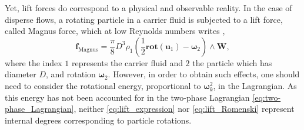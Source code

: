 \documentclass{myclass}
\newcommand{\vel}{\bm{u}}
\newcommand{\lift}{\bm{f}}
\newcommand{\pth}[1]  {\left( #1 \right)}
\newcommand{\rot}{\mathbf{rot}}
\begin{document}
Yet, lift forces do correspond to a physical and observable reality. In the case of disperse flows, a rotating particle in a carrier fluid is subjected to a lift force, called Magnus force, which at low Reynolds numbers writes \cite{rubinow:1961,crowe:2011}, 
\begin{equation}
\lift_{\text{Magnus}} = \frac{\pi}{8}D^3\rho_1 \pth{\frac{1}{2}\rot(\vel_1)-\bm{\omega}_2}\wedge\bm{W},
\end{equation}
where the index $1$ represents the carrier fluid and $2$ the particle which has diameter $D$, and rotation $\bm{\omega}_2$. However, in order to obtain such effects, one should need to consider the rotational energy, proportional to $\bm{\omega}_k^2$, in the Lagrangian. As this energy has not been accounted for in the two-phase Lagrangian \eqref{eq:two-phase_Lagrangian}, neither \eqref{eq:lift_expression} nor \eqref{eq:lift_Romenski} represent internal degrees corresponding to particle rotations.
\end{document}
